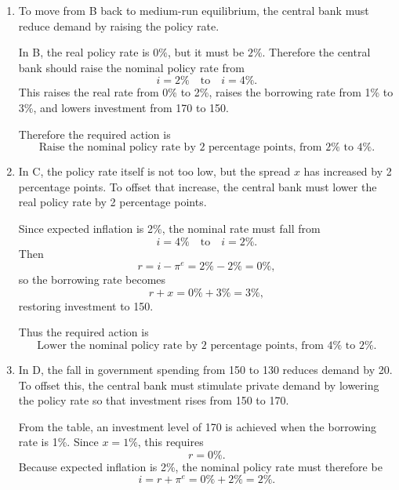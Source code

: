 \documentclass[12pt]{article}
\begin{document}
\begin{enumerate}[label=(\alph*)]
    \paragraph{Situation E.}
    Here,
    \[
    Y=1050>Y_n,\qquad u=3\%<u_n,\qquad \pi=3\%>\pi^e.
    \]
    Again,
    \[
    r=i-\pi^e=4\%-2\%=2\%=r_n,
    \qquad
    r+x=2\%+1\%=3\%.
    \]
    So investment is still at its equilibrium level \(I=150\). The problem is instead that government spending has risen from 150 to 170, pushing demand above potential output. Hence E is not a medium-run equilibrium:
    \[
    \boxed{\text{Situation E is not a medium-run equilibrium.}}
    \]

    \item
    To move from B back to medium-run equilibrium, the central bank must reduce demand by raising the policy rate.

    In B, the real policy rate is \(0\%\), but it must be \(2\%\). Therefore the central bank should raise the nominal policy rate from
    \[
    i=2\% \quad \text{to} \quad i=4\%.
    \]
    This raises the real rate from 0\% to 2\%, raises the borrowing rate from 1\% to 3\%, and lowers investment from 170 to 150.

    Therefore the required action is
    \[
    \boxed{\text{Raise the nominal policy rate by 2 percentage points, from }2\%\text{ to }4\%.}
    \]

    \item
    In C, the policy rate itself is not too low, but the spread \(x\) has increased by 2 percentage points. To offset that increase, the central bank must lower the real policy rate by 2 percentage points.

    Since expected inflation is 2\%, the nominal rate must fall from
    \[
    i=4\% \quad \text{to} \quad i=2\%.
    \]
    Then
    \[
    r=i-\pi^e=2\%-2\%=0\%,
    \]
    so the borrowing rate becomes
    \[
    r+x=0\%+3\%=3\%,
    \]
    restoring investment to 150.

    Thus the required action is
    \[
    \boxed{\text{Lower the nominal policy rate by 2 percentage points, from }4\%\text{ to }2\%.}
    \]

    \item
    In D, the fall in government spending from 150 to 130 reduces demand by 20. To offset this, the central bank must stimulate private demand by lowering the policy rate so that investment rises from 150 to 170.

    From the table, an investment level of 170 is achieved when the borrowing rate is 1\%. Since \(x=1\%\), this requires
    \[
    r=0\%.
    \]
    Because expected inflation is 2\%, the nominal policy rate must therefore be
    \[
    i=r+\pi^e=0\%+2\%=2\%.
    \]


\end{enumerate}
\end{document}
